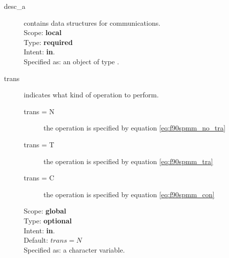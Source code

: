 \begin{description}
\item[desc\_a] contains data structures for communications.\\
Scope: {\bf local} \\
Type: {\bf required}\\
Intent: {\bf in}.\\
Specified as: an object of type \descdata.
\item[trans] indicates what kind of operation to perform.
\begin{description}
\item[trans = N] the operation is specified by equation \ref{eq:f90spmm_no_tra}
\item[trans = T] the operation is specified by equation
\ref{eq:f90spmm_tra}
\item[trans = C] the operation is specified by equation
\ref{eq:f90spmm_con}
\end{description}
Scope: {\bf global} \\
Type: {\bf optional}\\	
Intent: {\bf in}.\\
Default: $trans = N$\\	
Specified as: a character variable.


\end{description}
